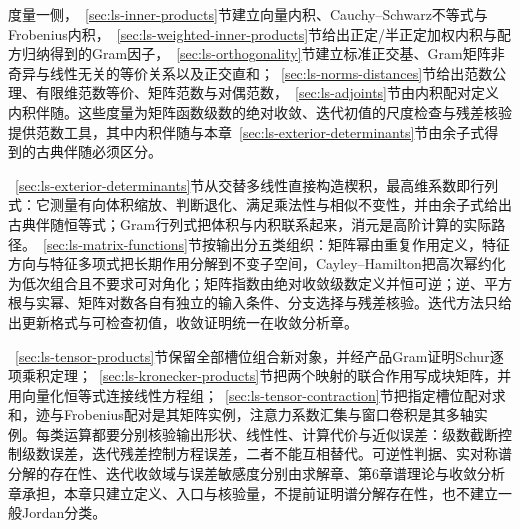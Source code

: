 度量一侧，~\ref{sec:ls-inner-products}节建立向量内积、Cauchy--Schwarz不等式与Frobenius内积，~\ref{sec:ls-weighted-inner-products}节给出正定/半正定加权内积与配方归纳得到的Gram因子，~\ref{sec:ls-orthogonality}节建立标准正交基、Gram矩阵非奇异与线性无关的等价关系以及正交直和；~\ref{sec:ls-norms-distances}节给出范数公理、有限维范数等价、矩阵范数与对偶范数，~\ref{sec:ls-adjoints}节由内积配对定义内积伴随。这些度量为矩阵函数级数的绝对收敛、迭代初值的尺度检查与残差核验提供范数工具，其中内积伴随与本章~\ref{sec:ls-exterior-determinants}节由余子式得到的古典伴随必须区分。

~\ref{sec:ls-exterior-determinants}节从交替多线性直接构造楔积，最高维系数即行列式：它测量有向体积缩放、判断退化、满足乘法性与相似不变性，并由余子式给出古典伴随恒等式；Gram行列式把体积与内积联系起来，消元是高阶计算的实际路径。~\ref{sec:ls-matrix-functions}节按输出分五类组织：矩阵幂由重复作用定义，特征方向与特征多项式把长期作用分解到不变子空间，Cayley--Hamilton把高次幂约化为低次组合且不要求可对角化；矩阵指数由绝对收敛级数定义并恒可逆；逆、平方根与实幂、矩阵对数各自有独立的输入条件、分支选择与残差核验。迭代方法只给出更新格式与可检查初值，收敛证明统一在收敛分析章。

~\ref{sec:ls-tensor-products}节保留全部槽位组合新对象，并经产品Gram证明Schur逐项乘积定理；~\ref{sec:ls-kronecker-products}节把两个映射的联合作用写成块矩阵，并用向量化恒等式连接线性方程组；~\ref{sec:ls-tensor-contraction}节把指定槽位配对求和，迹与Frobenius配对是其矩阵实例，注意力系数汇集与窗口卷积是其多轴实例。每类运算都要分别核验输出形状、线性性、计算代价与近似误差：级数截断控制级数误差，迭代残差控制方程误差，二者不能互相替代。可逆性判据、实对称谱分解的存在性、迭代收敛域与误差敏感度分别由求解章、第6章谱理论与收敛分析章承担，本章只建立定义、入口与核验量，不提前证明谱分解存在性，也不建立一般Jordan分类。
